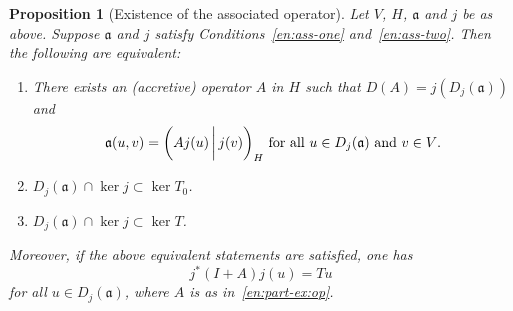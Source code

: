 \documentclass[a4paper,oneside,12pt]{amsart}
\theoremstyle{plain}
\newtheorem{proposition}[theorem]{Proposition}
\theoremstyle{definition}
\begin{document}
\begin{proposition}[Existence of the associated operator]\label{prop:gen-welldef}
Let $V$, $H$, ${{\mathfrak{{a}}}}$ and $j$ be as above.
Suppose ${{\mathfrak{{a}}}}$ and $j$ satisfy Conditions~\ref{en:ass-one} and~\ref{en:ass-two}.
Then the following are equivalent:
\begin{enumerate}[\upshape (i)]
\item\label{en:part-ex:op} 
There exists an (accretive) operator $A$ in $H$ such that $D(A)=j(D_j({{\mathfrak{{a}}}}))$ and
\[
    {{\mathfrak{{a}}}}(u,v)={{\ifthenelse{\equal{auto}{auto}}{\left({Aj(u)}\mkern3mu{\biggm|}\mkern3mu {j(v)}\right)}{}
\ifthenelse{\equal{auto}{b}}{\bigl({Aj(u)}\mkern3mu{\biggm|}\mkern3mu {j(v)}\bigr)}{}
\ifthenelse{\equal{auto}{B}}{\Bigl({Aj(u)}\mkern3mu{\bigm|}\mkern3mu {j(v)}\Bigr)}{}
}}_H\text{ for all $u\in D_j({{\mathfrak{{a}}}})$ and $v\in V$.}
\]
\item\label{en:part-ex:wd0} $D_j({{\mathfrak{{a}}}})\cap\ker j\subset\ker T_0$.
\item\label{en:part-ex:wd} $D_j({{\mathfrak{{a}}}})\cap\ker j\subset\ker T$.
\end{enumerate}
Moreover, if the above equivalent statements are satisfied, one has 
\begin{equation}\label{eq:rel-T-IpA}
    j^*(I+A)j(u) = Tu
\end{equation}
for all $u\in D_j({{\mathfrak{{a}}}})$,
where $A$ is as in~\ref{en:part-ex:op}.
\end{proposition}
\end{document}
